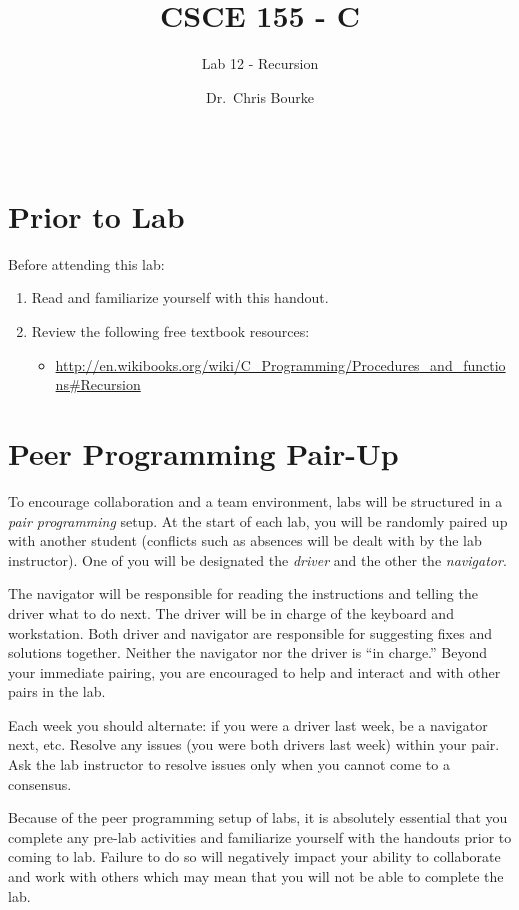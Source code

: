 \documentclass[12pt]{scrartcl}
\title{CSCE 155 - C}
\subtitle{Lab 12 - Recursion}
\author{Dr.\ Chris Bourke}
\date{~}
\begin{document}
\maketitle

\section*{Prior to Lab}

Before attending this lab:
\begin{enumerate}
  \item Read and familiarize yourself with this handout.
  \item Review the following free textbook resources:
	\begin{itemize}
  	  \item \url{http://en.wikibooks.org/wiki/C_Programming/Procedures_and_functions#Recursion}
	\end{itemize}
\end{enumerate}

\section*{Peer Programming Pair-Up}

To encourage collaboration and a team environment, labs will be
structured in a \emph{pair programming} setup.  At the start of
each lab, you will be randomly paired up with another student 
(conflicts such as absences will be dealt with by the lab instructor).
One of you will be designated the \emph{driver} and the other
the \emph{navigator}.  

The navigator will be responsible for reading the instructions and
telling the driver what to do next.  The driver will be in charge of the
keyboard and workstation.  Both driver and navigator are responsible
for suggesting fixes and solutions together.  Neither the navigator
nor the driver is ``in charge.''  Beyond your immediate pairing, you
are encouraged to help and interact and with other pairs in the lab.

Each week you should alternate: if you were a driver last week, 
be a navigator next, etc.  Resolve any issues (you were both drivers
last week) within your pair.  Ask the lab instructor to resolve issues
only when you cannot come to a consensus.  

Because of the peer programming setup of labs, it is absolutely 
essential that you complete any pre-lab activities and familiarize
yourself with the handouts prior to coming to lab.  Failure to do
so will negatively impact your ability to collaborate and work with 
others which may mean that you will not be able to complete the
lab.  
\end{document}
